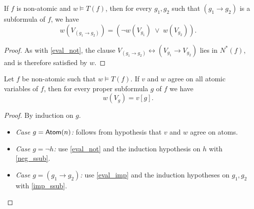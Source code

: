 \begin{lemma}
    \label{eval_imp}
    \leanok
    If $f$ is non-atomic and $w \models T(f)$, then for every $g_1, g_2$ such that $(g_1 \to g_2)$ is a subformula of $f$, we have
    \[
    w(V_{(g_1 \to g_2)}) = (\neg w(V_{g_1}) \;\lor\; w(V_{g_2})).
    \]
\end{lemma}
\begin{proof}
    \leanok
    As with \ref{eval_not}, the clause $V_{(g_1 \to g_2)} \leftrightarrow (V_{g_1} \to V_{g_2})$ lies in $N^*(f)$, and is therefore satisfied by $w$.
\end{proof}

\begin{theorem}
    \label{eval_eq_of_mem_ssub}
    \leanok
    Let $f$ be non-atomic such that $w \models T(f)$.
    If $v$ and $w$ agree on all atomic variables of $f$, then for every proper subformula $g$ of $f$ we have
    \[
    w(V_g) = v[g].
    \]
\end{theorem}
\begin{proof}
    \leanok
    By induction on $g$.
    \begin{itemize}
        \item \emph{Case $g=\mathsf{Atom}(n)$:} follows from hypothesis that $v$ and $w$ agree on atoms.  
        \item \emph{Case $g=\neg h$:} use \ref{eval_not} and the induction hypothesis on $h$ with \ref{neg_ssub}.  
        \item \emph{Case $g=(g_1 \to g_2)$:} use \ref{eval_imp} and the induction hypotheses on $g_1,g_2$ with \ref{imp_ssub}.
    \end{itemize}
\end{proof}
